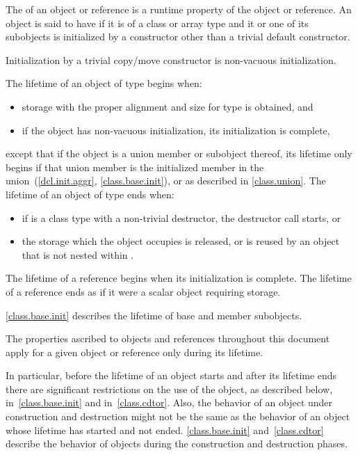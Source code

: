 \pnum
{}%
The  of an object or reference is a runtime property of the
object or reference.
An object is said to have  if it is of a class or
array type and it or one of its subobjects is initialized by a constructor
other than a trivial default constructor. \begin{note} Initialization by a
trivial copy/move constructor is non-vacuous initialization. \end{note}
The lifetime of an object of type  begins when:
\begin{itemize}
\item storage with the proper alignment and size for type  is
obtained, and
\item if the object has non-vacuous initialization, its initialization is complete,
\end{itemize}
except that if the object is a union member or subobject thereof,
its lifetime only begins if that union member is the
initialized member in the union~(\ref{dcl.init.aggr}, \ref{class.base.init}),
or as described in \ref{class.union}.
The lifetime of an object  of type  ends when:
\begin{itemize}
\item if  is a class type with a non-trivial
destructor, the destructor call starts, or
\item the storage which the object occupies is released,
or is reused by an object that is not nested within .
\end{itemize}

\pnum
{}%
The lifetime of a reference begins when its initialization is complete.
The lifetime of a reference ends as if it were a scalar object requiring storage.

\pnum
\begin{note} \ref{class.base.init}
describes the lifetime of base and member subobjects. \end{note}

\pnum
The properties ascribed to objects and references throughout this document
apply for a given object or reference only during its lifetime. \begin{note}
In particular, before the lifetime of an object starts and after its
lifetime ends there are significant restrictions on the use of the
object, as described below, in~\ref{class.base.init} and
in~\ref{class.cdtor}. Also, the behavior of an object under construction
and destruction might not be the same as the behavior of an object whose
lifetime has started and not ended. \ref{class.base.init}
and~\ref{class.cdtor} describe the behavior of objects during the
construction and destruction phases. \end{note}


